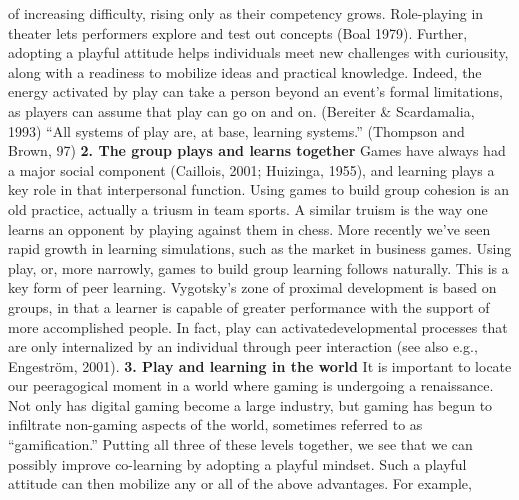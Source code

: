 of increasing difficulty, rising only as their competency grows.
Role-playing in theater lets performers explore and test out concepts
(Boal 1979). Further, adopting a playful attitude helps individuals meet
new challenges with curiousity, along with a readiness to mobilize ideas
and practical knowledge. Indeed, the energy activated by play can take a
person beyond an event's formal limitations, as players can assume that
play can go on and on. (Bereiter \& Scardamalia, 1993) ``All systems of
play are, at base, learning systems.'' (Thompson and Brown, 97)
\textbf{2. The group plays and learns together} Games have always had a
major social component (Caillois, 2001; Huizinga, 1955), and learning
plays a key role in that interpersonal function. Using games to build
group cohesion is an old practice, actually a triusm in team sports. A
similar truism is the way one learns an opponent by playing against them
in chess. More recently we've seen rapid growth in learning simulations,
such as the market in business games. Using play, or, more narrowly,
games to build group learning follows naturally. This is a key form of
peer learning. Vygotsky's zone of proximal development is based on
groups, in that a learner is capable of greater performance with the
support of more accomplished people. In fact, play can
activatedevelopmental processes that are only internalized by an
individual through peer interaction (see also e.g., Engeström, 2001).
\textbf{3. Play and learning in the world} It is important to locate our
peeragogical moment in a world where gaming is undergoing a renaissance.
Not only has digital gaming become a large industry, but gaming has
begun to infiltrate non-gaming aspects of the world, sometimes referred
to as ``gamification.'' Putting all three of these levels together, we
see that we can possibly improve co-learning by adopting a playful
mindset. Such a playful attitude can then mobilize any or all of the
above advantages. For example,

